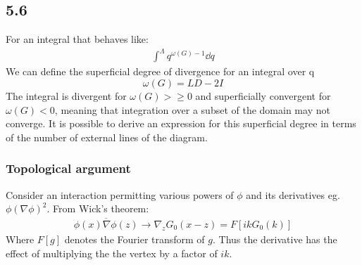 
\subsection{5.6}
For an integral that behaves like:
\begin{align*}
    \int^{\Lambda}q^{\omega(G)-1}\dd q
\end{align*}
We can define the superficial degree of divergence for an integral over q %
\begin{equation*}
    \omega(G)=LD-2I
\end{equation*}
The integral is divergent for $\omega(G)>\geq0$ and superficially convergent for $\omega(G)<0$, meaning that integration over a subset of the domain may not converge.
It is possible to derive an expression for this superficial degree in terms of the number of external lines of the diagram.
\\

\subsubsection{Topological argument}
Consider an interaction permitting various powers of $\phi$ and its derivatives eg. $\phi(\nabla\phi)^2$.
From Wick's theorem:
\begin{align*}
    \overline{\phi(x)\nabla\phi(z)}\rightarrow\nabla_z G_0(x-z)=F[ikG_0(k)]
\end{align*}
Where $F[g]$ denotes the Fourier transform of $g$. Thus the derivative has the effect of multiplying the the vertex by a factor of $ik$.

